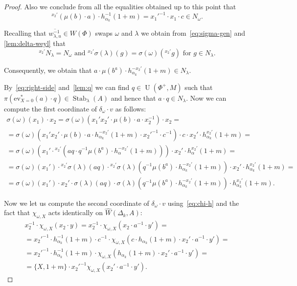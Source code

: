 \documentclass[oneside, 10pt]{amsart}
\DeclareMathOperator{\UU}{U}
\DeclareMathOperator{\Stab}{Stab}
\newcommand{\StW}{\widehat{W}}
\numberwithin{equation}{section}
\numberwithin{thm}{section}
\numberwithin{lemma}{section}
\theoremstyle{definition}
\theoremstyle{remark}
\begin{document}
\begin{proof}
Also we conclude from all the equalities obtained up to this point that
\begin{equation} {}^{x_2'}(\mu(b) \cdot a) \cdot h_{\alpha_k}^{-1}(1+m) = {x_1'}^{-1} \cdot x_1 \cdot c \in N_\omega. \end{equation}

Recalling that $\overline{w_{\lambda, u}^{-1}} \in W(\Phi)$ swaps $\omega$ and $\lambda$
we obtain from~\eqref{eq:sigma-gen} and \cref{lem:delta-weyl} that
\begin{equation} \label{eq:delta-weyl-x2prime} {}^{x_2'}N_\lambda = N_\omega\text{ and } {}^{x_2'}\sigma(\lambda)(g) = \sigma(\omega)({}^{x_2'}g)\text{ for } g\in N_\lambda.\end{equation}

Consequently, we obtain that
$a \cdot \mu(b^a) \cdot h_{\alpha_k}^{-{x_2'}}(1+m) \in {N_{\lambda}}$.

By~\eqref{eq:right-side} and~\cref{lem:q} we can find $q \in \UU(\Phi^+, M)$ such that $\pi(\mathrm{ev}_{X=0}^*(a) \cdot q) \in \Stab_\lambda(A)$ and hence
that $a \cdot q \in N_\lambda$.
Now we can compute the first coordinate of $\delta_\omega \cdot v$ as follows:
\begin{multline} \label{eq:intermediate}
\sigma(\omega)(x_1) \cdot x_2 = \sigma(\omega)(x_1'x_2' \cdot \mu(b) \cdot a \cdot x_2^{-1}) \cdot x_2 = \\
= \sigma(\omega)(x_1'x_2' \cdot \mu(b) \cdot a \cdot h^{-{x_2'}}_{\alpha_k}(1+m) \cdot {x_2'}^{-1} \cdot c^{-1}) \cdot c \cdot x_2' \cdot h_{\alpha_k}^{x_2'}(1+m) = \\
= \sigma(\omega)\left(x_1'\cdot {}^{x_2'} (aq \cdot q^{-1} \mu(b^a) \cdot h^{-x_2'}_\alpha(1+m))\right) \cdot x_2' \cdot h_{\alpha}^{x_2'}(1+m) = \\
= \sigma(\omega)(x_1') \cdot {}^{x_2'}\sigma(\lambda)(aq) \cdot {}^{x_2'}\sigma(\lambda)(q^{-1} \mu(b^a) \cdot h^{-x_2'}_{\alpha_k}(1+m)) \cdot x_2' \cdot h^{x_2'}_{\alpha_k}(1+m) = \\
= \sigma(\omega)(x_1') \cdot x_2' \cdot \sigma(\lambda)(aq) \cdot \sigma(\lambda)\left(q^{-1} \mu(b^a) \cdot h^{-x_2'}_{\alpha_k}(1+m)\right) \cdot h^{x_2'}_{\alpha_k}(1+m).
\end{multline}

Now we let us compute the second coordinate of $\delta_\omega \cdot v$ using~\eqref{eq:chi-h} and the fact that
$\chi_{\omega, X}$ acts identically on $\StW(\Delta_k, A)$:
\begin{multline}\label{eq:intermediate2}
x_2^{-1}\cdot \chi_{\omega, X}(x_2 \cdot y) = x_2^{-1} \cdot \chi_{\omega, X}(x_2 \cdot a^{-1} \cdot y') = \\
= {x_2'}^{-1} \cdot h_{\alpha_k}^{-1}(1 + m) \cdot c^{-1} \cdot \chi_{\omega, X}(c \cdot h_{\alpha_k}(1 + m) \cdot x_2' \cdot a^{-1} \cdot y') = \\
= {x_2'}^{-1} \cdot h_{\alpha_k}^{-1}(1 + m) \cdot \chi_{\omega, X}(h_{\alpha_k}(1 + m) \cdot x_2' \cdot a^{-1} \cdot y') = \\
= \{X, 1+m\} \cdot {x_2'}^{-1} \chi_{\omega, X}(x_2' \cdot a^{-1} \cdot y').
\end{multline}


\end{proof}
\end{document}
